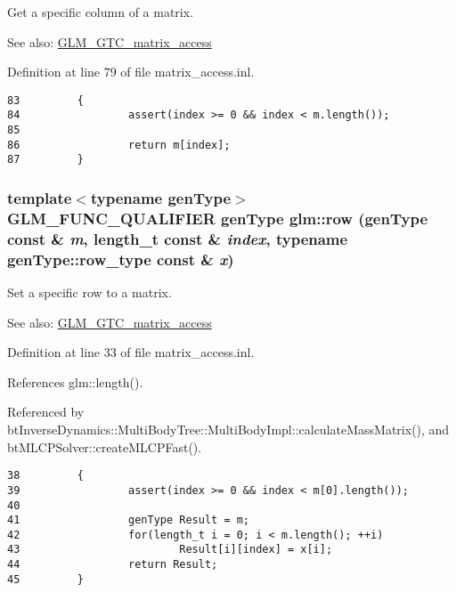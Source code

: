 Get a specific column of a matrix. \begin{Desc}
\item[See also:]\hyperlink{group__gtc__matrix__access}{GLM\_\-GTC\_\-matrix\_\-access} \end{Desc}


Definition at line 79 of file matrix\_\-access.inl.

\begin{Code}\begin{verbatim}83         {
84                 assert(index >= 0 && index < m.length());
85 
86                 return m[index];
87         }
\end{verbatim}
\end{Code}


\hypertarget{group__gtc__matrix__access_g4409b9c0604f3ed3e6f116b6680eae44}{
\subsubsection[row]{\setlength{\rightskip}{0pt plus 5cm}template$<$typename genType$>$ GLM\_\-FUNC\_\-QUALIFIER genType glm::row (genType const \& {\em m}, \/  length\_\-t const \& {\em index}, \/  typename genType::row\_\-type const \& {\em x})}}
\label{group__gtc__matrix__access_g4409b9c0604f3ed3e6f116b6680eae44}


Set a specific row to a matrix. \begin{Desc}
\item[See also:]\hyperlink{group__gtc__matrix__access}{GLM\_\-GTC\_\-matrix\_\-access} \end{Desc}


Definition at line 33 of file matrix\_\-access.inl.

References glm::length().

Referenced by btInverseDynamics::MultiBodyTree::MultiBodyImpl::calculateMassMatrix(), and btMLCPSolver::createMLCPFast().

\begin{Code}\begin{verbatim}38         {
39                 assert(index >= 0 && index < m[0].length());
40 
41                 genType Result = m;
42                 for(length_t i = 0; i < m.length(); ++i)
43                         Result[i][index] = x[i];
44                 return Result;
45         }
\end{verbatim}
\end{Code}




